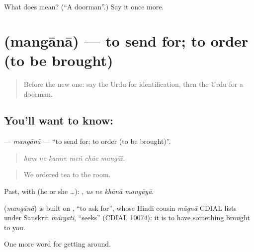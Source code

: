 \begin{tcolorbox}[breakable,colback=teal!4,colframe=teal!35!black,title={Before you move on}]
What does  mean? (\textquotedblleft{}A doorman\textquotedblright{}.) Say it once more.
\end{tcolorbox}
\section[\texorpdfstring{\ur{منگانا} (mangānā)}{منگانا (mangānā)}]{ (mangānā) — to send for; to order (to be brought)}

\label{lesson:UR-C405-mangana}



\begin{quote}
Before the new one: say the Urdu for identification, then the Urdu for a doorman.
\end{quote}

\subsection*{You'll want to know: }
\textbf{} — \emph{mangānā} — \textquotedblleft{}to send for; to order (to be brought)\textquotedblright{}.

\begin{quote}
     
\end{quote}

\begin{quote}
\emph{ham ne kamre meṅ chāe mangāī.}
\end{quote}

\begin{quote}
We ordered tea to the room.
\end{quote}

Past, with  (he or she …):    , \emph{us ne khānā mangāyā}.

\begin{cousinweb}
\textbf{} (\emph{mangānā}) is built on \textbf{}, \textquotedblleft{}to ask for\textquotedblright{}, whose Hindi cousin \emph{māgnā} CDIAL lists under Sanskrit \emph{mārgati}, \textquotedblleft{}seeks\textquotedblright{} (CDIAL 10074): it is to have something brought to you.
\end{cousinweb}

\begin{grammarlens}[title={What you've built}]
One more word for getting around.
\end{grammarlens}

